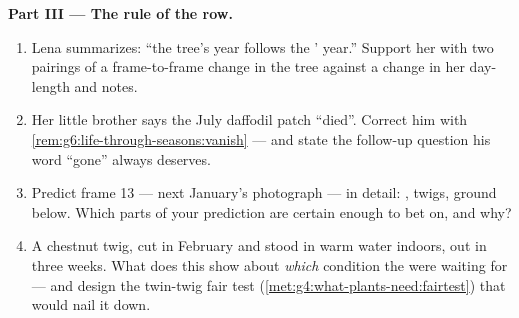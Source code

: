 \begin{problem}
\medskip\noindent\textbf{Part III --- The rule of the row.}
\begin{enumerate}[resume]
  \item Lena summarizes: ``the tree's year follows the
        ' year.'' Support her with two pairings
        of a frame-to-frame change in the tree against a
        change in her day-length and  notes.
  \item Her little brother says the July daffodil patch
        ``died''. Correct him with
        \cref{rem:g6:life-through-seasons:vanish} --- and
        state the follow-up question his word ``gone''
        always deserves.
  \item Predict frame 13 --- next January's photograph ---
        in detail: , twigs, ground below. Which
        parts of your prediction are certain enough to bet
        on, and why?
  \item A chestnut twig, cut in February and stood in warm
        water indoors,  out in three weeks. What does
        this show about \emph{which} condition the 
        were waiting for --- and design the twin-twig fair
        test (\cref{met:g4:what-plants-need:fairtest}) that
        would nail it down.
\end{enumerate}
\end{problem}
